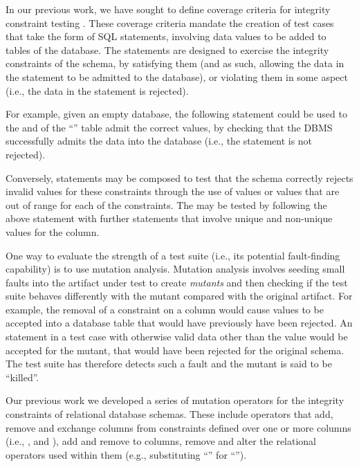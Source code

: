 In our previous work, we have sought to define coverage criteria for integrity constraint testing \cite{McMinn2015}. These coverage criteria mandate the creation of test cases that take the form of SQL \INSERT statements, involving data values to be added to tables of the database. The \INSERT statements are designed to exercise the integrity constraints of the schema, by satisfying them (and as such, allowing the data in the \INSERT statement to be admitted to the database), or violating them in some aspect (i.e., the data in the \INSERT statement is rejected).

For example, given an empty database, the following \INSERT statement could be used to the \NOTNULL and \CCs of the ``'' table admit the correct values, by checking that the DBMS successfully admits the data into the database (i.e., the \INSERT statement is not rejected).

\vspace{-0.5em}
\begin{center}
\end{center}
\vspace{-0.5em}

Conversely, \INSERT statements may be composed to test that the schema correctly rejects invalid values for these constraints through the use of \NULL values or values that are out of range for each of the \CHECK constraints. The \PK may be tested by following the above statement with further \INSERT statements that involve unique and non-unique values for the  column.

One way to evaluate the strength of a test suite (i.e., its potential fault-finding capability) is to use mutation analysis. Mutation analysis involves seeding small faults into the artifact under test to create {\it mutants} and then checking if the test suite behaves differently with the mutant compared with the original artifact. For example, the removal of a \NOTNULL constraint on a column would cause \NULL values to be accepted into a database table that would have previously have been rejected. An \INSERT statement in a test case with otherwise valid data other than the \NULL value would be accepted for the mutant, that would have been rejected for the original schema. The test suite has therefore detects such a fault and the mutant is said to be ``killed''. 

Our previous work \cite{Kapfhammer2013,Wright2013,Wright2014} we developed a series of mutation operators for the integrity constraints of relational database schemas. These include operators that add, remove and exchange columns from constraints defined over one or more columns (i.e., \PKs, \FKs and \UCs), add and remove \NNCs to columns, remove \CCs and alter the relational operators used within them (e.g., substituting ``\sql{>}'' for ``\sql{>=}'').


